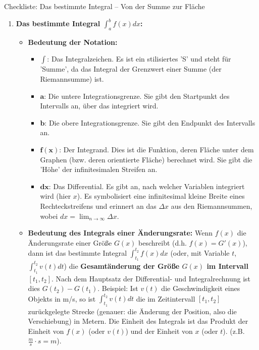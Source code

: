 \begin{loesungsumgebung}{Checkliste: Das bestimmte Integral – Von der Summe zur Fläche}
\begin{enumerate}[label=(\alph*)]
    \item \textbf{Das bestimmte Integral $\int_a^b f(x)dx$:}
    \begin{itemize}
        \item \textbf{Bedeutung der Notation:}
        \begin{itemize}
            \item $\mathbf{\int}$: Das Integralzeichen. Es ist ein stilisiertes 'S' und steht für 'Summe', da das Integral der Grenzwert einer Summe (der Riemannsumme) ist.
            \item $\mathbf{a}$: Die untere Integrationsgrenze. Sie gibt den Startpunkt des Intervalls an, über das integriert wird.
            \item $\mathbf{b}$: Die obere Integrationsgrenze. Sie gibt den Endpunkt des Intervalls an.
            \item $\mathbf{f(x)}$: Der Integrand. Dies ist die Funktion, deren Fläche unter dem Graphen (bzw. deren orientierte Fläche) berechnet wird. Sie gibt die 'Höhe' der infinitesimalen Streifen an.
            \item $\mathbf{dx}$: Das Differential. Es gibt an, nach welcher Variablen integriert wird (hier $x$). Es symbolisiert eine infinitesimal kleine Breite eines Rechteckstreifens und erinnert an das $\Delta x$ aus den Riemannsummen, wobei $dx = \lim_{n \to \infty} \Delta x$.
        \end{itemize}
        \item \textbf{Bedeutung des Integrals einer Änderungsrate:}
        Wenn $f(x)$ die Änderungsrate einer Größe $G(x)$ beschreibt (d.h. $f(x) = G'(x)$), dann ist das bestimmte Integral $\int_{t_1}^{t_2} f(x)dx$ (oder, mit Variable $t$, $\int_{t_1}^{t_2} v(t)dt$) die \textbf{Gesamtänderung der Größe $G(x)$ im Intervall $[t_1, t_2]$}. Nach dem Hauptsatz der Differential- und Integralrechnung ist dies $G(t_2) - G(t_1)$.
        Beispiel: Ist $v(t)$ die Geschwindigkeit eines Objekts in m/s, so ist $\int_{t_1}^{t_2} v(t)dt$ die im Zeitintervall $[t_1, t_2]$ zurückgelegte Strecke (genauer: die Änderung der Position, also die Verschiebung) in Metern. Die Einheit des Integrals ist das Produkt der Einheit von $f(x)$ (oder $v(t)$) und der Einheit von $x$ (oder $t$). (z.B. $\frac{m}{s} \cdot s = m$).
    \end{itemize}


\end{enumerate}
\end{loesungsumgebung}
